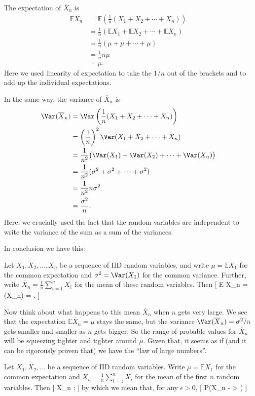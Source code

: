 \documentclass[
  letterpaper,
]{report}
\theoremstyle{definition}
\theoremstyle{definition}
\theoremstyle{remark}
\begin{document}
The expectation of \(\bar X_n\) is \begin{align*}
\mathbb E \overline X_n &= \mathbb E \left( \frac{1}{n} (X_1 + X_2 + \cdots + X_n)\right) \\
&=   \frac{1}{n} (\mathbb EX_1 + \mathbb EX_2 + \cdots + \mathbb EX_n)\\
&= \frac{1}{n} (\mu + \mu + \cdots + \mu)\\
&= \frac{1}{n} n \mu \\
&= \mu .
\end{align*} Here we used linearity of expectation to take the \(1/n\)
out of the brackets and to add up the individual expectations.

In the same way, the variance of \(\overline X_n\) is \begin{align*}
\Var( \overline X_n) &= \Var \left( \frac{1}{n} (X_1 + X_2 + \cdots + X_n)\right) \\
&= \left(\frac{1}{n}\right)^2 \Var(X_1 + X_2 + \cdots + X_n) \\
&=   \frac{1}{n^2} \big(\Var(X_1) + \Var(X_2) + \cdots + \Var (X_n)\big)\\
&= \frac{1}{n^2} (\sigma^2 + \sigma^2+ \cdots + \sigma^2)\\
&= \frac{1}{n^2} n \sigma^2 \\
&= \frac{\sigma^2}{n} .
\end{align*} Here, we crucially used the fact that the random variables
are independent to write the variance of the sum as a sum of the
variances.

In conclusion we have this:

Let \(X_1, X_2, \dots, X_n\) be a sequence of IID random variables, and
write \(\mu = \mathbb EX_1\) for the common expectation and
\(\sigma^2 = \Var(X_1)\) for the common variance. Further, write
\(\overline X_n =\frac{1}{n} \sum_{i=1}^n X_i\) for the mean of these
random variables. Then {[} \mathbb E \overline X\_n =
\mu \qquad \Var(\overline X\_n) =  . {]}

Now think about what happens to this mean \(\overline X_n\) when \(n\)
gets very large. We see that the expectation
\(\mathbb E\overline X_n = \mu\) stays the same, but the variance
\(\Var(\overline X_n) = \sigma^2/n\) gets smaller and smaller as \(n\)
gets bigger. So the range of probable values for \(\overline X_n\) will
be squeezing tighter and tighter around \(\mu\). Given that, it seems as
if (and it can be rigorously proven that) we have the ``law of large
numbers''.

\leavevmode{}%
Let \(X_1, X_2, \dots\) be a sequence of IID random variables. Write
\(\mu = \mathbb EX_1\) for the common expectation and
\(\overline X_n =\frac{1}{n} \sum_{i=1}^n X_i\) for the mean of the
first \(n\) random variables. Then {[} \overline X\_n
\to \mu \quad {}; {]} by which we
mean that, for any \(\epsilon > 0\), {[}
\mathbb P\big(\textbar{}\overline X\_n - \mu\textbar{} \textgreater{}
\epsilon\big)  \quad {} {]}
\end{document}
